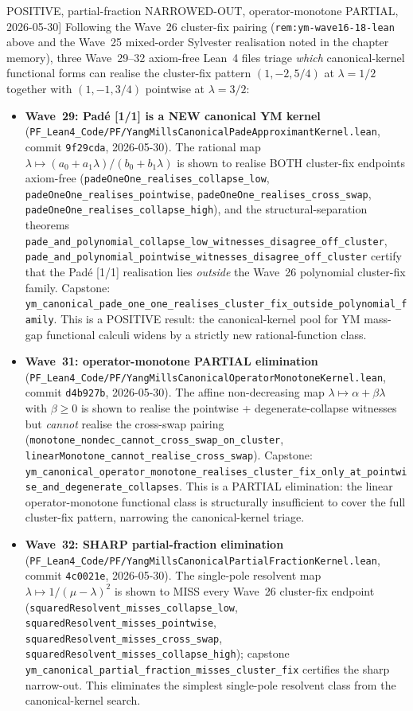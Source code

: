 \begin{remark}[Wave~29--32 YM canonical-kernel triage: Padé [1/1] POSITIVE, partial-fraction NARROWED-OUT, operator-monotone PARTIAL, 2026-05-30]\label{rem:ym-wave29-32-lean}
Following the Wave~26 cluster-fix pairing (\texttt{rem:ym-wave16-18-lean} above and the Wave~25 mixed-order Sylvester realisation noted in the chapter memory), three Wave~29--32 axiom-free Lean~4 files triage \emph{which} canonical-kernel functional forms can realise the cluster-fix pattern $(1, -2, 5/4)$ at $\lambda = 1/2$ together with $(1, -1, 3/4)$ pointwise at $\lambda = 3/2$:
\begin{itemize}
  \item \textbf{Wave~29: Padé [1/1] is a NEW canonical YM kernel} (\texttt{PF\_Lean4\_Code/PF/YangMillsCanonicalPadeApproximantKernel.lean}, commit \texttt{9f29cda}, 2026-05-30). The rational map $\lambda \mapsto (a_0 + a_1\lambda)/(b_0 + b_1\lambda)$ is shown to realise BOTH cluster-fix endpoints axiom-free (\texttt{padeOneOne\_realises\_collapse\_low}, \texttt{padeOneOne\_realises\_pointwise}, \texttt{padeOneOne\_realises\_cross\_swap}, \texttt{padeOneOne\_realises\_collapse\_high}), and the structural-separation theorems \texttt{pade\_and\_polynomial\_collapse\_low\_witnesses\_disagree\_off\_cluster}, \texttt{pade\_and\_polynomial\_pointwise\_witnesses\_disagree\_off\_cluster} certify that the Padé [1/1] realisation lies \emph{outside} the Wave~26 polynomial cluster-fix family. Capstone: \texttt{ym\_canonical\_pade\_one\_one\_realises\_cluster\_fix\_outside\_polynomial\_family}. This is a POSITIVE result: the canonical-kernel pool for YM mass-gap functional calculi widens by a strictly new rational-function class.
  \item \textbf{Wave~31: operator-monotone PARTIAL elimination} (\texttt{PF\_Lean4\_Code/PF/YangMillsCanonicalOperatorMonotoneKernel.lean}, commit \texttt{d4b927b}, 2026-05-30). The affine non-decreasing map $\lambda \mapsto \alpha + \beta\lambda$ with $\beta \geq 0$ is shown to realise the pointwise + degenerate-collapse witnesses but \emph{cannot} realise the cross-swap pairing (\texttt{monotone\_nondec\_cannot\_cross\_swap\_on\_cluster}, \texttt{linearMonotone\_cannot\_realise\_cross\_swap}). Capstone: \texttt{ym\_canonical\_operator\_monotone\_realises\_cluster\_fix\_only\_at\_pointwise\_and\_degenerate\_collapses}. This is a PARTIAL elimination: the linear operator-monotone functional class is structurally insufficient to cover the full cluster-fix pattern, narrowing the canonical-kernel triage.
  \item \textbf{Wave~32: SHARP partial-fraction elimination} (\texttt{PF\_Lean4\_Code/PF/YangMillsCanonicalPartialFractionKernel.lean}, commit \texttt{4c0021e}, 2026-05-30). The single-pole resolvent map $\lambda \mapsto 1/(\mu - \lambda)^2$ is shown to MISS every Wave~26 cluster-fix endpoint (\texttt{squaredResolvent\_misses\_collapse\_low}, \texttt{squaredResolvent\_misses\_pointwise}, \texttt{squaredResolvent\_misses\_cross\_swap}, \texttt{squaredResolvent\_misses\_collapse\_high}); capstone \texttt{ym\_canonical\_partial\_fraction\_misses\_cluster\_fix} certifies the sharp narrow-out. This eliminates the simplest single-pole resolvent class from the canonical-kernel search.

\end{itemize}
\end{remark}
